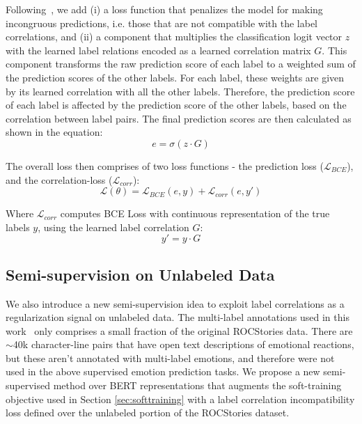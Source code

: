\documentclass[11pt,a4paper]{article}
\begin{document}
Following~\citet{zhao-etal-2019-review}, we add (i) a loss function that penalizes the model for making incongruous predictions, i.e. those that are not compatible with the label correlations, and (ii) a component that multiplies the classification logit vector $z$ with the learned label relations encoded as a learned correlation matrix $G$. This component transforms the raw prediction score of each label to a weighted sum of the prediction scores of the other labels. For each label, these weights are given by its learned correlation with all the other labels. Therefore, the prediction score of each label is affected by the prediction score of the other labels, based on the correlation between label pairs. The final prediction scores are then calculated as shown in the equation:   
\begin{equation}
    e = \sigma(z \cdot G)
    \label{eqn:soft_pred}
\end{equation}

The overall loss then comprises of two loss functions - the prediction loss ($\mathcal{L}_{BCE}$), and the correlation-loss ($\mathcal{L}_{corr}$): 
\begin{equation}
    \mathcal{L}(\theta) = \mathcal{L}_{BCE}(e, y) + \mathcal{L}_{corr}(e, y')
    \label{eqn:loss_soft}
\end{equation}

Where $\mathcal{L}_{corr}$ computes BCE Loss with continuous representation of the true labels $y$, using the learned label correlation $G$:
\begin{equation}
    y' = y \cdot G
\end{equation}

\subsection{Semi-supervision on Unlabeled Data}
We also introduce a new semi-supervision idea to exploit label correlations as a regularization signal on unlabeled data. The multi-label annotations used in this work~\cite{rashkin2018modeling} only comprises a small fraction of the original ROCStories data. There are $\sim$40k character-line pairs that have open text descriptions of emotional reactions, but these aren't annotated with multi-label emotions, and therefore were not used in the above supervised emotion prediction tasks. 
We propose a new semi-supervised method over BERT representations that augments the soft-training objective used in Section \ref{sec:softtraining} with a label correlation incompatibility loss defined over the unlabeled portion of the ROCStories dataset. 
\end{document}
